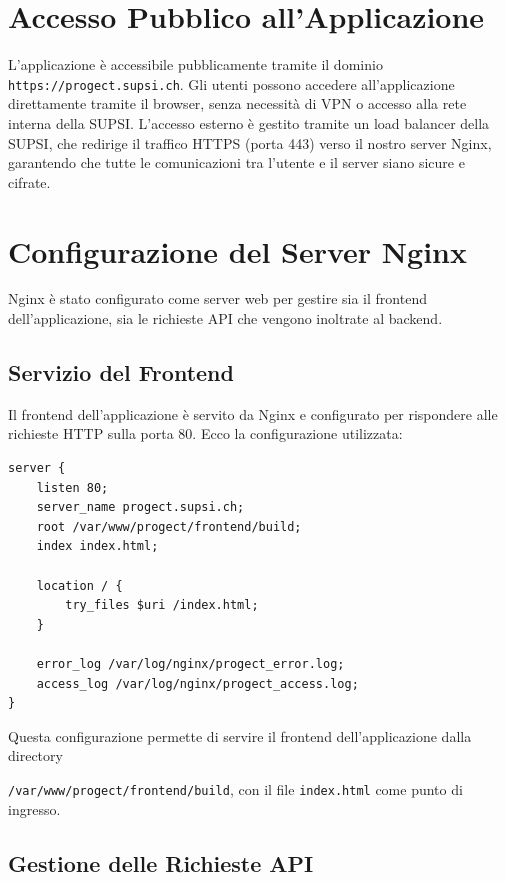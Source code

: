 \documentclass[twoside]{supsistudent}
\begin{document}
\section{Accesso Pubblico all'Applicazione}

L'applicazione è accessibile pubblicamente tramite il dominio \texttt{https://progect.supsi.ch}. Gli utenti possono accedere all'applicazione direttamente tramite il browser, senza necessità di VPN o accesso alla rete interna della SUPSI. L'accesso esterno è gestito tramite un load balancer della SUPSI, che redirige il traffico HTTPS (porta 443) verso il nostro server Nginx, garantendo che tutte le comunicazioni tra l'utente e il server siano sicure e cifrate.

\section{Configurazione del Server Nginx}

Nginx è stato configurato come server web per gestire sia il frontend dell'applicazione, sia le richieste API che vengono inoltrate al backend.

\subsection{Servizio del Frontend}

Il frontend dell'applicazione è servito da Nginx e configurato per rispondere alle richieste HTTP sulla porta 80. Ecco la configurazione utilizzata:

\begin{verbatim}
server {
    listen 80;
    server_name progect.supsi.ch;
    root /var/www/progect/frontend/build;
    index index.html;

    location / {
        try_files $uri /index.html;
    }

    error_log /var/log/nginx/progect_error.log;
    access_log /var/log/nginx/progect_access.log;
}
\end{verbatim}

Questa configurazione permette di servire il frontend dell'applicazione dalla directory

\texttt{/var/www/progect/frontend/build}, con il file \texttt{index.html} come punto di ingresso.

\subsection{Gestione delle Richieste API}
\end{document}
